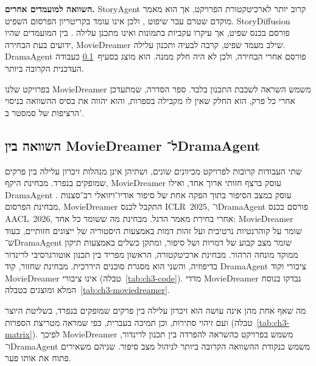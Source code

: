 \textbf{השוואה למועמדים אחרים.} \textenglish{StoryAgent} קרוב יותר לארכיטקטורת הפרויקט, אך הוא מאמר מוקדם שטרם עבר שיפוט \cite{hu2024storyagent}, ולכן אינו עומד בקריטריון הפרסום השפיט. \textenglish{StoryDiffusion} פורסם בכנס שפיט, אך עיקרו עקביות בתמונות ואינו מתכנן עלילה \cite{zhou2024storydiffusion}. בין המועמדים שהיו ידועים בעת הבחירה, \textenglish{MovieDreamer} שילב מעמד שפיט, קרבה לבעיה ותכנון עלילה. \textenglish{DramaAgent} פורסם אחרי הבחירה, ולכן לא היה חלק ממנה. הוא מוצג בסעיף~\ref{sec:ch3-md-da} כעבודה העדכנית הקרובה ביותר.

\begin{directornote}
  בפרויקט שלנו \textenglish{MovieDreamer} משמש השראה לשכבת התכנון בלבד. ספר הסדרה, שמתעדכן אחרי כל פרק, הוא החלק שאין לו מקבילה בספרות, והוא יהווה את בסיס ההשוואה בניסוי הרציפות של סמסטר ב'.
\end{directornote}

\subsection{השוואה בין \textenglish{MovieDreamer} ל־\textenglish{DramaAgent}}
\label{sec:ch3-md-da}
שתי העבודות קרובות לפרויקט מכיוונים שונים, ושתיהן אינן מנהלות זיכרון עלילה בין פרקים שמופקים בנפרד. מבחינת היקף, \textenglish{MovieDreamer} עוסק ברצף חזותי ארוך אחד, ואילו \textenglish{DramaAgent} עוסק במצב הסיפור בתוך הפקה אחת של סיפור אודיו־ויזואלי רב־סצנות \cite{zhao2025moviedreamer,huang2026dramaagent}. מבחינת הפרסום, \textenglish{MovieDreamer} התקבל לכנס \mbox{\textenglish{ICLR 2025}}, ו־\textenglish{DramaAgent} פורסם בכנס \mbox{\textenglish{AACL 2026}}, אחרי בחירת מאמר הדגל. מבחינת מה ששומר כל אחד: \textenglish{MovieDreamer} שומר על קוהרנטיות נרטיבית ועל זהות דמות באמצעות היסטוריה של ייצוגים חזותיים, בעוד ש־\textenglish{DramaAgent} שומר מצב קבוע של דמויות ושל סיפור, ומתקן כשלים באמצעות תיקון ממוקד מונחה הרהור. מבחינת ארכיטקטורה, הראשון מפריד בין תכנון אוטורגרסיבי לרינדור בדיפוזיה, והשני הוא מסגרת סוכנים היררכית. מבחינת שחזור, קוד \textenglish{DramaAgent} ציבורי וקוד \textenglish{MovieDreamer} אינו ציבורי (טבלה~\ref{tab:ch3-code}). מדדי \textenglish{MovieDreamer} נבדקו בנוסח המלא ומוצגים בטבלה~\ref{tab:ch3-moviedreamer}.

מה שאף אחת מהן אינה עושה הוא זיכרון עלילה בין פרקים שמופקים בנפרד, בשליטת היוצר ועם זיהוי סתירות, וכן תמיכה בעברית, כפי שמראה מטריצת הספרות (טבלה~\ref{tab:ch3-matrix}). לפיכך \textenglish{MovieDreamer} משמש בפרויקט כהשראה להפרדה בין תכנון לרינדור, ו־\textenglish{DramaAgent} משמש כנקודת ההשוואה הקרובה ביותר לניהול מצב סיפור. שניהם משאירים פתוח את אותו פער.

